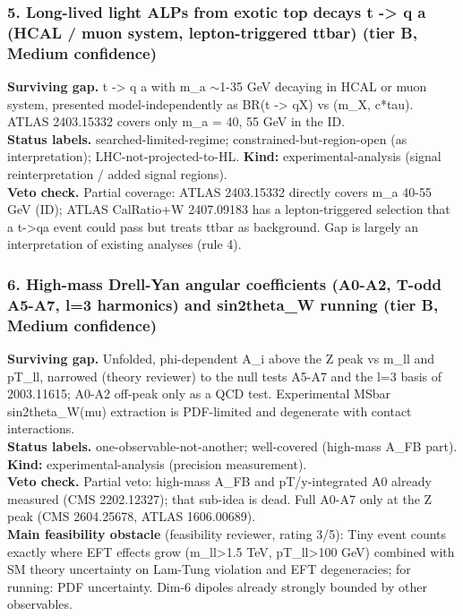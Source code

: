 \documentclass[11pt,a4paper]{article}
\begin{document}
\subsubsection*{5. Long-lived light ALPs from exotic top decays t -> q a (HCAL / muon system, lepton-triggered ttbar) (tier B, Medium confidence)}
\textbf{Surviving gap.} t -> q a with m\_a $\sim$1-35 GeV decaying in HCAL or muon system, presented model-independently as BR(t -> qX) vs (m\_X, c*tau). ATLAS 2403.15332 covers only m\_a = 40, 55 GeV in the ID.\\
\textbf{Status labels.} searched-limited-regime; constrained-but-region-open (as interpretation); LHC-not-projected-to-HL. \textbf{Kind:} experimental-analysis (signal reinterpretation / added signal regions).\\
\textbf{Veto check.} Partial coverage: ATLAS 2403.15332 directly covers m\_a 40-55 GeV (ID); ATLAS CalRatio+W 2407.09183 has a lepton-triggered selection that a t->qa event could pass but treats ttbar as background. Gap is largely an interpretation of existing analyses (rule 4).

\subsubsection*{6. High-mass Drell-Yan angular coefficients (A0-A2, T-odd A5-A7, l=3 harmonics) and sin2theta\_W running (tier B, Medium confidence)}
\textbf{Surviving gap.} Unfolded, phi-dependent A\_i above the Z peak vs m\_ll and pT\_ll, narrowed (theory reviewer) to the null tests A5-A7 and the l=3 basis of 2003.11615; A0-A2 off-peak only as a QCD test. Experimental MSbar sin2theta\_W(mu) extraction is PDF-limited and degenerate with contact interactions.\\
\textbf{Status labels.} one-observable-not-another; well-covered (high-mass A\_FB part). \textbf{Kind:} experimental-analysis (precision measurement).\\
\textbf{Veto check.} Partial veto: high-mass A\_FB and pT/y-integrated A0 already measured (CMS 2202.12327); that sub-idea is dead. Full A0-A7 only at the Z peak (CMS 2604.25678, ATLAS 1606.00689).
\\\textbf{Main feasibility obstacle} (feasibility reviewer, rating 3/5): Tiny event counts exactly where EFT effects grow (m\_ll>1.5 TeV, pT\_ll>100 GeV) combined with SM theory uncertainty on Lam-Tung violation and EFT degeneracies; for running: PDF uncertainty. Dim-6 dipoles already strongly bounded by other observables.
\end{document}

